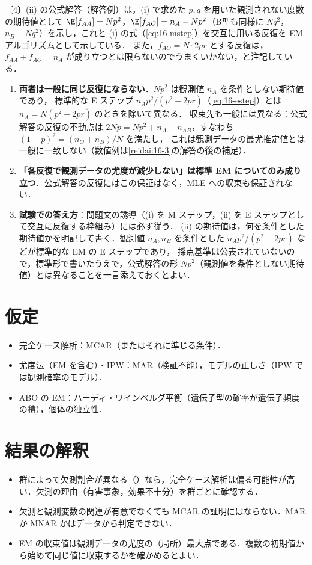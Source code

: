 \begin{warnbox}[試験の公式解答との相違]
〔4〕(ii) の公式解答（解答例）は，(i) で求めた $p,q$ を用いた観測されない度数の期待値として
$\E[f_{AA}]=Np^2$，$\E[f_{AO}]=n_A-Np^2$（B型も同様に $Nq^2$，$n_B-Nq^2$）を示し，これと (i) の式（\cref{eq:16-mstep}）を交互に用いる反復を EM アルゴリズムとして示している．
また，$f_{AO}=N\cdot2pr$ とする反復は，$f_{AA}+f_{AO}=n_A$ が成り立つとは限らないのでうまくいかない，と注記している．
\begin{enumerate}[label=(\arabic*)]
\item \textbf{両者は一般に同じ反復にならない}．$Np^2$ は観測値 $n_A$ を条件としない期待値であり，
      標準的な E ステップ $n_Ap^2/(p^2+2pr)$（\cref{eq:16-estep}）とは $n_A=N(p^2+2pr)$ のときを除いて異なる．
      収束先も一般には異なる：公式解答の反復の不動点は $2Np=Np^2+n_A+n_{AB}$，すなわち $(1-p)^2=(n_O+n_B)/N$ を満たし，
      これは観測データの最尤推定値とは一般に一致しない（数値例は\cref{reidai:16-3}の解答の後の補足）．
\item \textbf{「各反復で観測データの尤度が減少しない」は標準 EM についてのみ成り立つ}．公式解答の反復にはこの保証はなく，MLE への収束も保証されない．
\item \textbf{試験での答え方}：問題文の誘導（(i) を M ステップ，(ii) を E ステップとして交互に反復する枠組み）には必ず従う．
      (ii) の期待値は，何を条件とした期待値かを明記して書く．観測値 $n_A,n_B$ を条件とした $n_Ap^2/(p^2+2pr)$ などが標準的な EM の E ステップであり，
      採点基準は公表されていないので，標準形で書いたうえで，公式解答の形 $Np^2$（観測値を条件としない期待値）とは異なることを一言添えておくとよい．
\end{enumerate}
\end{warnbox}

\section{仮定}\label{sec:16-assump}
\begin{itemize}
\item 完全ケース解析：MCAR（またはそれに準じる条件）．
\item 尤度法（EM を含む）・IPW：MAR（検証不能），モデルの正しさ（IPW では観測確率のモデル）．
\item ABO の EM：ハーディ・ワインベルグ平衡（遺伝子型の確率が遺伝子頻度の積），個体の独立性．
\end{itemize}

\section{結果の解釈}\label{sec:16-interp}
\begin{itemize}
\item 群によって欠測割合が異なる（）なら，完全ケース解析は偏る可能性が高い．欠測の理由（有害事象，効果不十分）を群ごとに確認する．
\item 欠測と観測変数の関連が有意でなくても MCAR の証明にはならない．MAR か MNAR かはデータから判定できない．
\item EM の収束値は観測データの尤度の（局所）最大点である．複数の初期値から始めて同じ値に収束するかを確かめるとよい．
\end{itemize}

